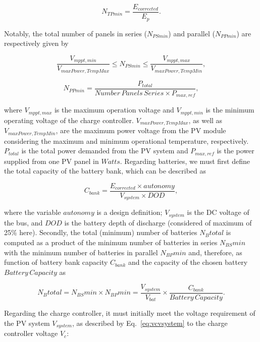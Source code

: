 \documentclass[runningheads]{llncs}
\begin{document}
\begin{equation}
\label{eq:NTPmin}
N_{TPmin} = \frac{E_{corrected}}{E_{p}}.
\end{equation}

Notably, the total number of panels in series ($N_{PSmin}$) and parallel ($N_{PPmin}$) are respectively given by

\begin{equation}
\label{eq:NPSmin}
\frac{V_{mppt,min}}{V_{maxPower,TempMax}} \leq N_{PSmin} \leq \frac{V_{mppt,max}}{V_{maxPower,TempMin}},
\end{equation}

\begin{equation}
\label{eq:NPPmin}
N_{PPmin} = \frac{P_{total}}{Number\,Panels\,Series \times P_{max,ref}},
\end{equation}

\noindent where $V_{mppt, max}$ is the maximum operation voltage and $V_{mppt,min}$ is the minimum operating voltage of the charge controller. $V_{maxPower, TempMax}$, as well as $V_{maxPower, TempMin}$, are the maximum power voltage from the PV module considering the maximum and minimum operational temperature, respectively. $P_{total}$ is the total power demanded from the PV system and $P_{max, ref}$ is the power supplied from one PV panel in $Watts$. Regarding batteries, we must first define the total capacity of the battery bank, which can be described as

\begin{equation}
\label{eq:Cbank}
C_{bank} = \frac{E_{corrected} \times autonomy}{V_{system} \times DOD},
\end{equation}

\noindent where the variable $autonomy$ is a design definition; 
$ V_{system} $ is the DC voltage of the bus, and $ DOD $ is the battery depth of discharge (considered of maximum of 25\% here).
Secondly, the total (minimum) number of batteries $N_{B}total$ is computed as a product of the minimum number of batteries in series $N_{BS}min$ with the minimum number of batteries in parallel $ N_{BP}min $ and, therefore, as function of battery bank capacity $ C_{bank} $ and the capacity of the chosen battery $ Battery \, Capacity $ as

\begin{equation}
\label{eq:Nbtotal}
N_{B}total = N_{BS}min \times N_{BP}min = \frac{V_{system}}{V_{bat}} \times \frac{C_{bank}}{Battery \, Capacity}.
\end{equation}

Regarding the charge controller, it must initially meet the voltage requirement of the PV system $V_{system}$, as described by Eq.~\ref{eq:vcvsystem} to the charge controller voltage $V_{c}$: 
\end{document}
